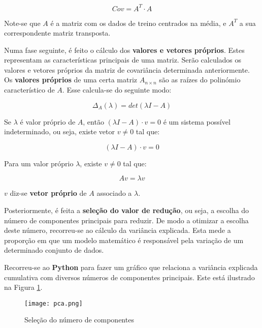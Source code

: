 $$Cov = A^T \cdot A$$

\noindent Note-se que $A$ é a matriz com os dados de treino centrados na média, e $A^T$ a sua correspondente matriz transposta. 

\vspace{0.5em}

\par Numa fase seguinte, é feito o cálculo dos \textbf{valores e vetores próprios}. Estes representam as características principais de uma matriz. Serão calculados os valores e vetores próprios da matriz de covariância determinada anteriormente. Os \textbf{valores próprios} de uma certa matriz $A_{n \times n}$ são as raízes do polinómio característico de $A$. Esse calcula-se do seguinte modo:

$$ \Delta _ A(\lambda) = det (\lambda I - A )$$

\noindent Se $\lambda$ é valor próprio de $A$, então $(\lambda I -A) \cdot v = 0$ é um sistema possível indeterminado, ou seja, existe vetor $v \neq 0$ tal que: 

$$(\lambda I -A) \cdot v = 0$$

\noindent Para um valor próprio $ \lambda $, existe $ v \neq 0 $ tal que:

$$ Av = \lambda v $$

\noindent $v$ diz-se \textbf{vetor próprio} de $A$ associado a $ \lambda $.

\vspace{0.5em}

\par Posteriormente, é feita a \textbf{seleção do valor de redução}, ou seja, a escolha do número de componentes principais para reduzir. De modo a otimizar a escolha deste número, recorreu-se ao cálculo da variância explicada. Esta mede a proporção em que um modelo matemático é responsável pela variação de um determinado conjunto de dados.

\vspace{0.5em}

\par Recorreu-se ao \textbf{Python} para fazer um gráfico que relaciona a variância explicada cumulativa com diversos números de componentes principais. Este está ilustrado na Figura \ref{img1}.

\begin{figure}[H]
    \centering
    \texttt{[image: pca.png]}
    \caption{Seleção do número de componentes}
    \label{img1}
\end{figure}


